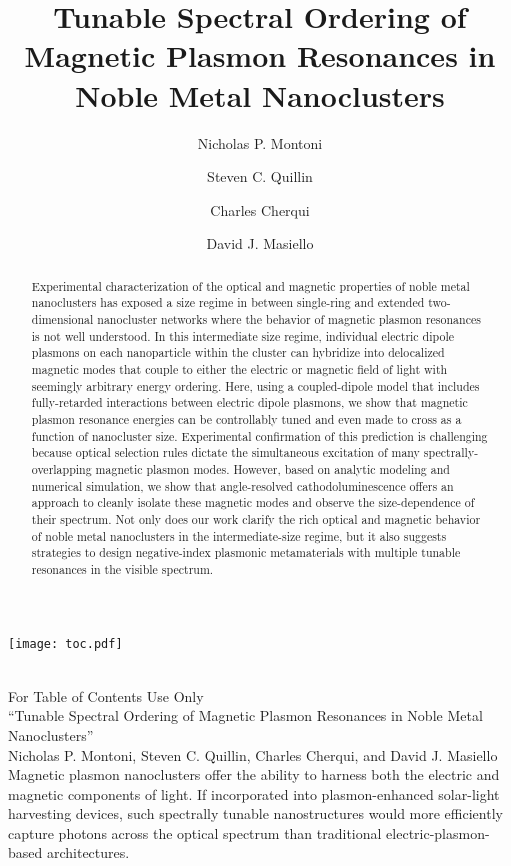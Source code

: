 \documentclass[journal=apchd5,manuscript=article]{achemso}
\author{Nicholas P. Montoni}
\author{Steven C. Quillin}
\author{Charles Cherqui}
\author{David J. Masiello}
\affiliation[Department of Chemistry, University of Washington]
{Department of Chemistry, University of Washington, Seattle, WA 98195}
\title[]
    {Tunable Spectral Ordering of Magnetic Plasmon Resonances in Noble Metal Nanoclusters}
\begin{document}
\begin{tocentry}
\begin{centering}
\texttt{[image: toc.pdf]}
\end{centering}
\ \\
For Table of Contents Use Only\\
``Tunable Spectral Ordering of Magnetic Plasmon Resonances in Noble Metal Nanoclusters''\\
Nicholas P. Montoni, Steven C. Quillin, Charles Cherqui, and David J. Masiello\\
Magnetic plasmon nanoclusters offer the ability to harness both the electric and magnetic components of light. If incorporated into plasmon-enhanced solar-light harvesting devices, such spectrally tunable nanostructures would more efficiently capture photons across the optical spectrum than traditional electric-plasmon-based architectures.
\end{tocentry}


\begin{abstract}
Experimental characterization of the optical and magnetic properties of noble metal nanoclusters has exposed a size regime in between single-ring and extended two-dimensional nanocluster networks where the behavior of magnetic plasmon resonances is not well understood. In this intermediate size regime, individual electric dipole plasmons on each nanoparticle within the cluster can hybridize into delocalized magnetic modes that couple to either the electric or magnetic field of light with seemingly arbitrary energy ordering. Here, using a coupled-dipole model that includes fully-retarded interactions between electric dipole plasmons, we show that magnetic plasmon resonance energies can be controllably tuned and even made to cross as a function of nanocluster size. Experimental confirmation of this prediction is challenging because optical selection rules dictate the simultaneous excitation of many spectrally-overlapping magnetic plasmon modes. However, based on analytic modeling and numerical simulation, we show that angle-resolved cathodoluminescence offers an approach to cleanly isolate these magnetic modes and observe the size-dependence of their spectrum. Not only does our work clarify the rich optical and magnetic behavior of noble metal nanoclusters in the intermediate-size regime, but it also suggests strategies to design negative-index plasmonic metamaterials with multiple tunable resonances in the visible spectrum.
\end{abstract}
\end{document}
